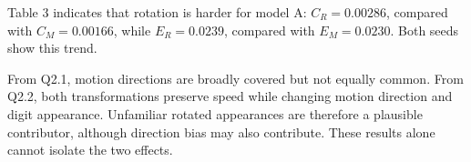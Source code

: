 Table 3 indicates that rotation is harder for model A: \(C_R=0.00286\), compared with \(C_M=0.00166\), while \(E_R=0.0239\), compared with \(E_M=0.0230\). Both seeds show this trend.

From Q2.1, motion directions are broadly covered but not equally common. From Q2.2, both transformations preserve speed while changing motion direction and digit appearance. Unfamiliar rotated appearances are therefore a plausible contributor, although direction bias may also contribute. These results alone cannot isolate the two effects.
